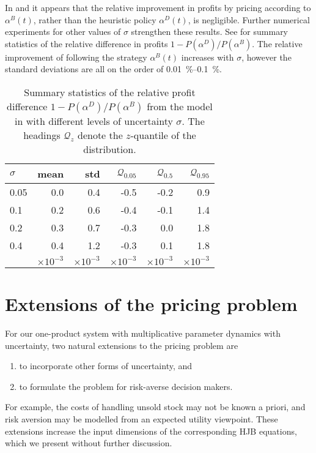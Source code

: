 \documentclass[main.tex]{subfiles}
\begin{document}
In  and
 it appears that the relative
improvement in profits by pricing according to $\alpha^B(t)$, rather than the heuristic
policy $\alpha^D(t)$, is negligible.
Further numerical experiments for other values of $\sigma$ strengthen
these results. See  for summary
statistics of the relative difference in profits
$1-P(\alpha^D)/P(\alpha^B)$.
The relative improvement of following the strategy $\alpha^B(t)$
increases with $\sigma$, however the standard deviations are all on
the order of \SIrange{0.01}{0.1}{\percent}.
\begin{table}[htb]
  \centering
  \begin{tabular}{lrrrrr}
    \toprule
    $\sigma$ & mean & std & $\mathcal{Q}_{0.05}$ & $\mathcal{Q}_{0.5}$ & $\mathcal{Q}_{0.95}$\\
    \midrule
    0.05& 0.0 & 0.4 &-0.5&-0.2&0.9\\
    0.1&0.2& 0.6&-0.4&-0.1&1.4\\
    0.2&0.3& 0.7&-0.3&0.0&1.8\\
    0.4&0.4& 1.2&-0.3&0.1&1.8\\
    \midrule
             & $\times 10^{-3}$&$\times 10^{-3}$&$\times 10^{-3}$&$\times 10^{-3}$&$\times 10^{-3}$\\
    \bottomrule
  \end{tabular}
  \caption[Profit statistics comparing the Bellman and
  deterministic-case policies]{Summary statistics of the relative profit difference
    $1-P(\alpha^D)/P(\alpha^B)$ from the model in
     with different levels of
    uncertainty $\sigma$.
    The headings $\mathcal{Q}_z$ denote the $z$-quantile of the distribution.
  }\label{tbl:profit_hjb_cec_statistics}
\end{table}

\section{Extensions of the pricing problem}\label{sec:extensions}
For our one-product system with multiplicative parameter dynamics with uncertainty,
two natural extensions to the pricing problem are
\begin{enumerate}
\item to incorporate
  other forms of uncertainty, and
\item to formulate the problem for risk-averse
  decision makers.
\end{enumerate}
For example, the costs of handling unsold stock may
not be known a priori, and risk aversion may be modelled from an
expected utility viewpoint.
These extensions increase the input dimensions of the corresponding
HJB equations, which we present without further discussion.
\end{document}
